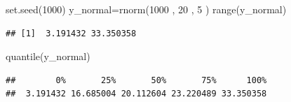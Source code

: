 \documentclass[
]{book}
\newenvironment{Shaded}{\begin{snugshade}}{\end{snugshade}}
\newcommand{\DecValTok}[1]{\textcolor[rgb]{0.00,0.00,0.81}{#1}}
\newcommand{\FunctionTok}[1]{\textcolor[rgb]{0.00,0.00,0.00}{#1}}
\newcommand{\NormalTok}[1]{#1}
\newcommand{\OtherTok}[1]{\textcolor[rgb]{0.56,0.35,0.01}{#1}}
\begin{document}
\begin{Shaded}
\begin{Highlighting}[]
\FunctionTok{set.seed}\NormalTok{(}\DecValTok{1000}\NormalTok{)}
\NormalTok{y\_normal}\OtherTok{=}\FunctionTok{rnorm}\NormalTok{(}\DecValTok{1000}\NormalTok{ , }\DecValTok{20}\NormalTok{ , }\DecValTok{5}\NormalTok{ )}
\FunctionTok{range}\NormalTok{(y\_normal)}
\end{Highlighting}
\end{Shaded}

\begin{verbatim}
## [1]  3.191432 33.350358
\end{verbatim}

\begin{Shaded}
\begin{Highlighting}[]
\FunctionTok{quantile}\NormalTok{(y\_normal)}
\end{Highlighting}
\end{Shaded}

\begin{verbatim}
##        0%       25%       50%       75%      100% 
##  3.191432 16.685004 20.112604 23.220489 33.350358
\end{verbatim}
\end{document}
